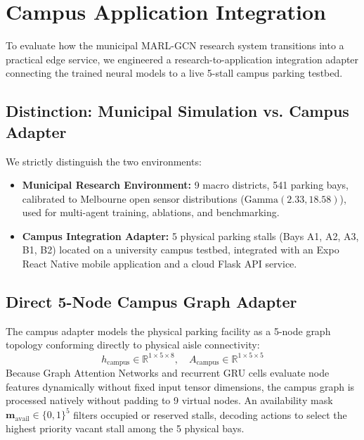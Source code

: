 \documentclass[journal]{IEEEtran}
\begin{document}
\section{Campus Application Integration}
\label{sec:campus}

To evaluate how the municipal MARL-GCN research system transitions into a practical edge service, we engineered a research-to-application integration adapter connecting the trained neural models to a live 5-stall campus parking testbed.

\subsection{Distinction: Municipal Simulation vs. Campus Adapter}
We strictly distinguish the two environments:
\begin{itemize}
    \item \textbf{Municipal Research Environment:} 9 macro districts, 541 parking bays, calibrated to Melbourne open sensor distributions ($\text{Gamma}(2.33, 18.58)$), used for multi-agent training, ablations, and benchmarking.
    \item \textbf{Campus Integration Adapter:} 5 physical parking stalls (Bays A1, A2, A3, B1, B2) located on a university campus testbed, integrated with an Expo React Native mobile application and a cloud Flask API service.
\end{itemize}

\subsection{Direct 5-Node Campus Graph Adapter}
The campus adapter models the physical parking facility as a 5-node graph topology conforming directly to physical aisle connectivity:
\begin{equation}
h_{\text{campus}} \in \mathbb{R}^{1 \times 5 \times 8}, \quad A_{\text{campus}} \in \mathbb{R}^{1 \times 5 \times 5}
\end{equation}
Because Graph Attention Networks and recurrent GRU cells evaluate node features dynamically without fixed input tensor dimensions, the campus graph is processed natively without padding to 9 virtual nodes. An availability mask $\mathbf{m}_{\text{avail}} \in \{0, 1\}^5$ filters occupied or reserved stalls, decoding actions to select the highest priority vacant stall among the 5 physical bays.
\end{document}
